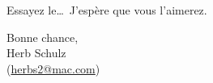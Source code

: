\documentclass[11pt,french]{article}
\newcommand{\TS}{\textsf{\TeX Shop}}
\newcommand{\mnu}[1]{\textsf{#1}}
\newcommand{\cmd}[1]{\textsf{#1}}
\begin{document}
%

%

%


%


\vspace{5pt plus 2pt minus 1pt}\noindent
Essayez le\dots\ J'espère que vous l'aimerez.

\vspace{5pt plus 2pt minus 1pt}
\noindent Bonne chance,\\
Herb Schulz\\
(\href{mailto:herbs2@mac.com}{herbs2@mac.com})
\end{document}
